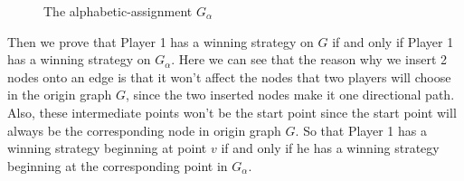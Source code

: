 \begin{figure}[h]
    \centering
    \caption{The alphabetic-assignment $G_\alpha$}
\end{figure}
    Then we prove that Player 1 has a winning strategy on $G$ if and only if Player 1 has a winning strategy on $G_\alpha$. Here we can see that the reason why we insert \color{red} 2 \color{black} nodes onto an edge is that it won't affect the nodes that two players will choose in the origin graph $G$, since the two inserted nodes make it one directional path. Also, these intermediate points won't be the start point since the start point will always be the corresponding node in origin graph $G$. So that Player 1 has a winning strategy beginning at point $v$ if and only if he has a winning strategy beginning at the corresponding point in $G_\alpha$.

